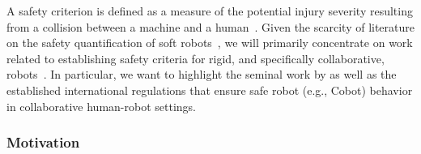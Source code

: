 A safety criterion is defined as a measure of the potential injury severity resulting from a collision between a machine and a human~\citep{haddadin2013towards}. Given the scarcity of literature on the safety quantification of soft robots~\citep{abidi2017intrinsic}, we will primarily concentrate on work related to establishing safety criteria for rigid, and specifically collaborative, robots~\citep{zinn2004playing, de2008atlas, haddadin2013towards}. In particular, we want to highlight the seminal work by \citet{haddadin2013towards} as well as the established international regulations that ensure safe robot (e.g., \gls{Cobot}) behavior in collaborative human-robot settings.

\subsubsection{Motivation}

